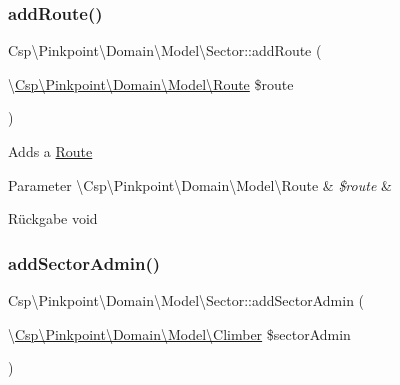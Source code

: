 \subsubsection{\texorpdfstring{add\+Route()}{addRoute()}}
{\footnotesize\ttfamily Csp\textbackslash{}\+Pinkpoint\textbackslash{}\+Domain\textbackslash{}\+Model\textbackslash{}\+Sector\+::add\+Route (\begin{DoxyParamCaption}\item[{\textbackslash{}\hyperlink{classCsp_1_1Pinkpoint_1_1Domain_1_1Model_1_1Route}{Csp\textbackslash{}\+Pinkpoint\textbackslash{}\+Domain\textbackslash{}\+Model\textbackslash{}\+Route}}]{\$route }\end{DoxyParamCaption})}

Adds a \hyperlink{classCsp_1_1Pinkpoint_1_1Domain_1_1Model_1_1Route}{Route}


\begin{DoxyParams}[1]{Parameter}
\textbackslash{}\+Csp\textbackslash{}\+Pinkpoint\textbackslash{}\+Domain\textbackslash{}\+Model\textbackslash{}\+Route & {\em \$route} & \\
\hline
\end{DoxyParams}
\begin{DoxyReturn}{Rückgabe}
void 
\end{DoxyReturn}
\mbox{\label{classCsp_1_1Pinkpoint_1_1Domain_1_1Model_1_1Sector_af9b321fd2d6e915208d48d82b3e1d0c0}} 
\subsubsection{\texorpdfstring{add\+Sector\+Admin()}{addSectorAdmin()}}
{\footnotesize\ttfamily Csp\textbackslash{}\+Pinkpoint\textbackslash{}\+Domain\textbackslash{}\+Model\textbackslash{}\+Sector\+::add\+Sector\+Admin (\begin{DoxyParamCaption}\item[{\textbackslash{}\hyperlink{classCsp_1_1Pinkpoint_1_1Domain_1_1Model_1_1Climber}{Csp\textbackslash{}\+Pinkpoint\textbackslash{}\+Domain\textbackslash{}\+Model\textbackslash{}\+Climber}}]{\$sector\+Admin }\end{DoxyParamCaption})}

